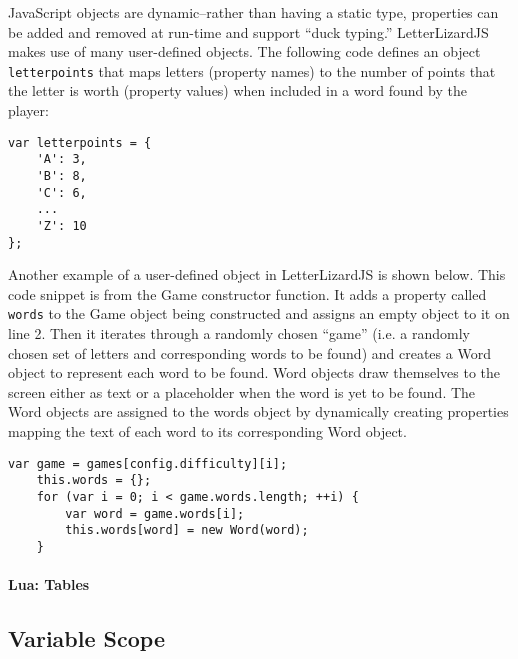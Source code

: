 JavaScript objects are dynamic--rather than having a static type, properties can be added
and removed at run-time and support ``duck typing.'' LetterLizardJS makes use of many
user-defined objects. The following code defines an object \texttt{letterpoints} that
maps letters (property names) to the number of points that the letter is worth
(property values) when included in a word found by the player:

\begin{lstlisting}[caption=A user-defined object in JavaScript.]
var letterpoints = {
	'A': 3,
	'B': 8,
	'C': 6,
	...
	'Z': 10
};
\end{lstlisting}

Another example of a user-defined object in LetterLizardJS is shown below. This code
snippet is from the Game constructor function. It adds a property called 
\texttt{words} to the Game object being constructed and assigns an empty object
to it on line 2. Then it iterates through a randomly chosen ``game'' (i.e. a
randomly chosen set of letters and corresponding words to be found) and creates
a Word object to represent each word to be found. Word objects draw themselves to the
screen either as text or a placeholder when the word is yet to be found. The Word
objects are assigned to the words object by dynamically creating properties mapping
the text of each word to its corresponding Word object.

\begin{lstlisting}[caption=A user-defined object demonstrating dynamic properties.]
	var game = games[config.difficulty][i];
	this.words = {};
	for (var i = 0; i < game.words.length; ++i) {
		var word = game.words[i];
		this.words[word] = new Word(word);
	}
\end{lstlisting}

\paragraph{Lua: Tables}


\subsection{Variable Scope}
\label{varscope}


